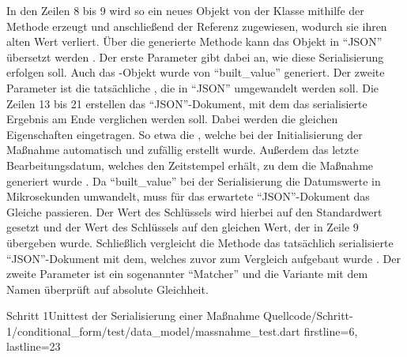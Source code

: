 In den Zeilen 8 bis 9 wird so ein neues Objekt von der Klasse  mithilfe der Methode  erzeugt und anschließend der Referenz  zugewiesen, wodurch sie ihren alten Wert verliert.
Über die generierte Methode  kann das Objekt in \enquote{JSON} übersetzt werden .
Der erste Parameter  gibt dabei an, wie diese Serialisierung erfolgen soll. Auch das -Objekt wurde von \enquote{built_value} generiert.
Der zweite Parameter ist die tatsächliche , die in \enquote{JSON} umgewandelt werden soll.
Die Zeilen 13 bis 21 erstellen das \enquote{JSON}-Dokument, mit dem das serialisierte Ergebnis am Ende verglichen werden soll. Dabei werden die gleichen Eigenschaften eingetragen.
So etwa die , welche bei der Initialisierung der Maßnahme automatisch und zufällig erstellt wurde.
Außerdem das letzte Bearbeitungsdatum, welches den Zeitstempel erhält, zu dem die Maßnahme generiert wurde .
Da \enquote{built_value} bei der Serialisierung die Datumswerte in Mikrosekunden umwandelt,
muss für das erwartete \enquote{JSON}-Dokument das Gleiche passieren.
Der Wert des Schlüssels   wird hierbei auf den Standardwert  gesetzt
und der Wert des Schlüssels   auf den gleichen Wert,
der in Zeile 9 übergeben wurde.
Schließlich vergleicht die Methode  das tatsächlich serialisierte \enquote{JSON}-Dokument mit dem,
welches zuvor zum Vergleich aufgebaut wurde .
Der zweite Parameter ist ein sogenannter \enquote{Matcher} und die Variante mit dem Namen  überprüft auf absolute Gleichheit.

\begin{alexlisting}{Schritt 1}{Unittest der Serialisierung einer Maßnahme}
  {Quellcode/Schritt-1/conditional_form/test/data_model/massnahme_test.dart}
  {firstline=6, lastline=23}
  \label{lst:SerialisierungEinerMassnahmeUnittest}
\end{alexlisting}